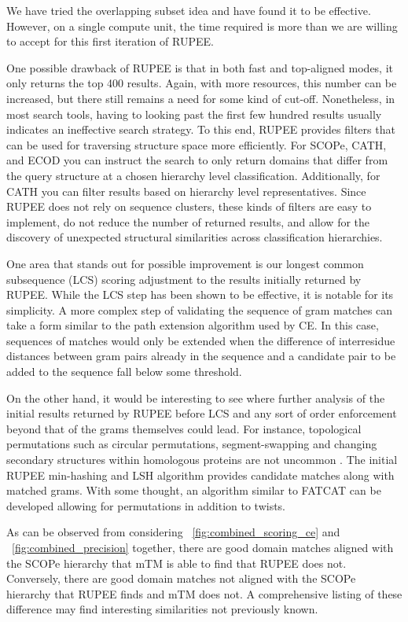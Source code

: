 \documentclass[letter,center,fleqn]{NAR}
\begin{document}
We have tried the overlapping subset idea and have found it to be effective. 
However, on a single compute unit, the time required is more than we are willing to accept for this first iteration of RUPEE. 

One possible drawback of RUPEE is that in both fast and top-aligned modes, it only returns the top 400 results. 
Again, with more resources, this number can be increased, but there still remains a need for some kind of cut-off. 
Nonetheless, in most search tools, having to looking past the first few hundred results usually indicates an ineffective search strategy.
To this end, RUPEE provides filters that can be used for traversing structure space more efficiently. 
For SCOPe, CATH, and ECOD you can instruct the search to only return domains that differ from the query structure at a chosen hierarchy level classification. 
Additionally, for CATH you can filter results based on hierarchy level representatives. 
Since RUPEE does not rely on sequence clusters, these kinds of filters are easy to implement, do not reduce the number of returned results, and allow for the discovery of unexpected structural similarities across classification hierarchies.  

One area that stands out for possible improvement is our longest common subsequence (LCS) scoring adjustment to the results initially returned by RUPEE. 
While the LCS step has been shown to be effective, it is notable for its simplicity. 
A more complex step of validating the sequence of gram matches can take a form similar to the path extension algorithm used by CE. 
In this case, sequences of matches would only be extended when the difference of interresidue distances between gram pairs already in the sequence and a candidate pair to be added to the sequence fall below some threshold.

On the other hand, it would be interesting to see where further analysis of the initial results returned by RUPEE before LCS and any sort of order enforcement beyond that of the grams themselves could lead. 
For instance, topological permutations such as circular permutations, segment-swapping and changing secondary structures within homologous proteins are not uncommon \cite{Andreeva2007}. 
The initial RUPEE min-hashing and LSH algorithm provides candidate matches along with matched grams. 
With some thought, an algorithm similar to FATCAT can be developed allowing for permutations in addition to twists. 

As can be observed from considering \figurename~\ref{fig:combined_scoring_ce} and \figurename~\ref{fig:combined_precision} together, there are good domain matches aligned with the SCOPe hierarchy that mTM is able to find that RUPEE does not. 
Conversely, there are good domain matches not aligned with the SCOPe hierarchy that RUPEE finds and mTM does not. 
A comprehensive listing of these difference may find interesting similarities not previously known. 
\end{document}
